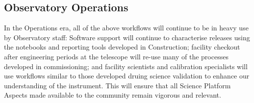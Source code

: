 \subsection{Observatory Operations}\label{observatory-operations}

In the Operations era, all of the above workflows will continue to be in heavy use by Observatory staff: Software support will continue to characterise releases using the notebooks and reporting tools developed in Construction; facility checkout after engineering periods at the telescope will re-use many of the processes developed in commissioning; and facility scientists and calibration specialists will use workflows similar to those developed druing science validation to enhance our understanding of the instrument. This will ensure that all Science Platform Aspects made available to the community remain vigorous and relevant.
